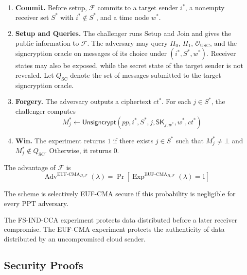 \documentclass[sigconf,anonymous]{acmart}
\theoremstyle{definition}
\theoremstyle{definition}
\theoremstyle{definition}
\theoremstyle{definition}
\theoremstyle{definition}
\theoremstyle{definition}
\theoremstyle{definition}
\theoremstyle{definition}
\theoremstyle{definition}
\begin{document}
\begin{enumerate}
	\item \textbf{Commit.}
	Before setup, $\mathcal{F}$ commits to a target sender $i^*$, a nonempty receiver set $S^*$ with $i^*\notin S^*$, and a time node $w^*$.
	
	\item \textbf{Setup and Queries.}
	The challenger runs \textsf{Setup} and \textsf{Join} and gives the public information to $\mathcal{F}$. The adversary may query $H_0$, $H_1$, $\mathcal{O}_{\mathrm{USC}}$, and the signcryption oracle on messages of its choice under $(i^*,S^*,w^*)$. Receiver states may also be exposed, while the secret state of the target sender is not revealed. Let $Q_{\mathrm{SC}}$ denote the set of messages submitted to the target signcryption oracle.
	
	\item \textbf{Forgery.}
	The adversary outputs a ciphertext $ct^*$. For each $j\in S^*$, the challenger computes
	\[
	M_j^*
	\leftarrow
	\textsf{Unsigncrypt}
	\left(
	pp,i^*,S^*,j,\mathsf{SK}_{j,w^*},w^*,ct^*
	\right)
	\]
	
	\item \textbf{Win.}
	The experiment returns $1$ if there exists $j\in S^*$ such that $M_j^*\neq\bot$ and $M_j^*\notin Q_{\mathrm{SC}}$. Otherwise, it returns $0$.
\end{enumerate}

The advantage of $\mathcal{F}$ is
\[
\operatorname{Adv}^{\mathrm{EUF\text{-}CMA}_{\Pi,\mathcal{F}}}(\lambda)
=
\Pr
\left[
\operatorname{Exp}^{\mathrm{EUF\text{-}CMA}_{\Pi,\mathcal{F}}}(\lambda)=1
\right]
\]

The scheme is selectively EUF-CMA secure if this probability is negligible for every PPT adversary.

The FS-IND-CCA experiment protects data distributed before a later receiver compromise. The EUF-CMA experiment protects the authenticity of data distributed by an uncompromised cloud sender.






\subsection{Security Proofs}
\end{document}
